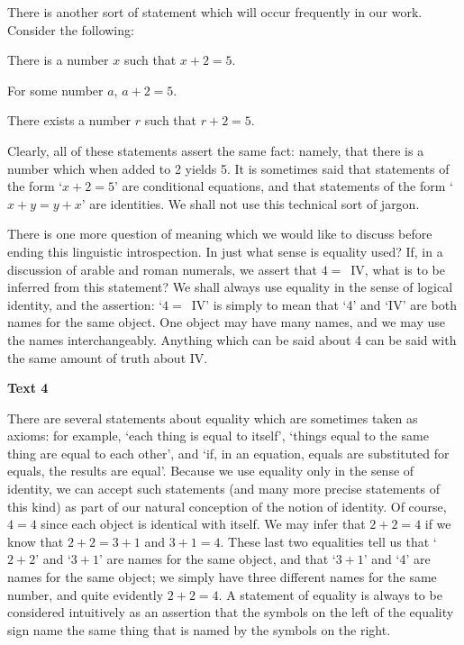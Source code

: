 \documentclass[a4paper]{article}
\newcommand{\ESect}[1]{\medskip\par{\large \textbf{#1}}\par}
\begin{document}
There is another sort of statement which will occur frequently in our work. Consider the following:

There is a number $x$ such that $x+2=5$.

For some number $a$, $a+2=5$.

There exists a number $r$ such that $r+2=5$.

Clearly, all of these statements assert the same fact: namely, that there is a number which when added to 2 yields 5.
It is sometimes said that statements of the form `$x+2=5$' are conditional equations, and that statements of the form
`$x+y=y+x$' are identities. We shall not use this technical sort of jargon.

There is one more question of meaning which we would like to discuss before ending this linguistic introspection. In
just what sense is equality used? If, in a discussion of arable and roman numerals, we assert that $4=$~IV, what is to be
inferred from this statement? We shall always use equality in the sense of logical identity, and the assertion: `$4=$~IV'
is simply to mean that `4' and `IV' are both names for the same object. One object may have many names, and we may use
the names interchangeably. Anything which can be said about 4 can be said with the same amount of truth about IV.

\ESect{Text 4}
There are several statements about equality which are sometimes taken as axioms: for example, `each thing is equal to
itself', `things equal to the same thing are equal to each other', and `if, in an equation, equals are substituted for
equals, the results are equal'. Because we use equality only in the sense of identity, we can accept such statements
(and many more precise statements of this kind) as part of our natural conception of the notion of identity. Of course,
$4=4$ since each object is identical with itself. We may infer that $2+2=4$ if we know that $2+2=3+1$ and $3+1=4$. These
last two equalities tell us that `$2+2$' and `$3+1$' are names for the same object, and that `$3+1$' and `4' are names
for the same object; we simply have three different names for the same number, and quite evidently $2+2=4$. A statement
of equality is always to be considered intuitively as an assertion that the symbols on the left of the equality sign name
the same thing that is named by the symbols on the right.
\end{document}
